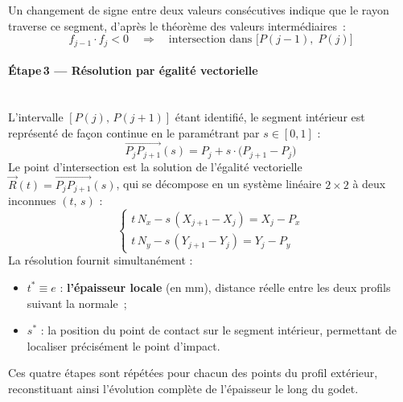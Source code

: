 Un changement de signe entre deux valeurs consécutives indique
que le rayon traverse ce segment, d'après le théorème des valeurs
intermédiaires~:
\[
    f_{j-1}\cdot f_j < 0
    \quad\Longrightarrow\quad
    \text{intersection dans }
    \bigl[P(j-1),\;P(j)\bigr]
\]

\paragraph{Étape\,3 — Résolution par égalité vectorielle}
\mbox{}\\
L'intervalle $[P(j),\,P(j+1)]$ étant identifié, le segment intérieur est
représenté de façon continue en le paramétrant par $s \in [0,1]$ :
\[
    \overrightarrow{P_j P_{j+1}}(s) = P_j + s\cdot\bigl(P_{j+1} - P_j\bigr)
    \tag{7}
\]
Le point d'intersection est la solution de l'égalité vectorielle
$\vec{R}(t) = \overrightarrow{P_j P_{j+1}}(s)$,
qui se décompose en un système linéaire $2 \times 2$ à deux inconnues
$(t,\,s)$ :
\[
    \begin{cases}
        t\,N_x - s\,(X_{j+1}-X_j) = X_j - P_x \\[4pt]
        t\,N_y - s\,(Y_{j+1}-Y_j) = Y_j - P_y
    \end{cases}
    \tag{8}
\]
La résolution fournit simultanément :
\begin{itemize}
    \item $t^* \equiv e$ : \textbf{l'épaisseur locale} (en mm),
    distance réelle entre les deux profils suivant la normale~;
    \item $s^*$ : la position du point de contact sur le segment intérieur,
    permettant de localiser précisément le point d'impact.
\end{itemize}
Ces quatre étapes sont répétées pour chacun des points du profil extérieur,
reconstituant ainsi l'évolution complète de l'épaisseur le long du godet.

